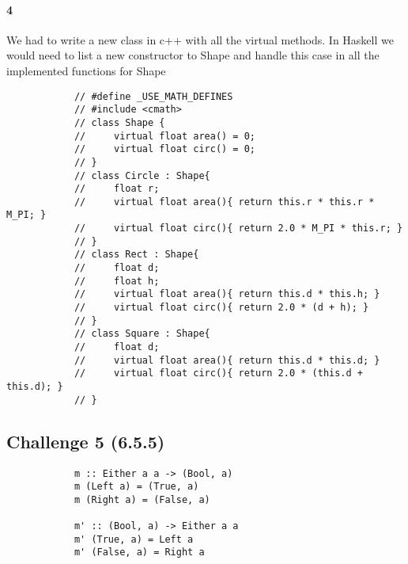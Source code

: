 \documentclass[11pt]{article}
\begin{document}
        \paragraph*{4}
        We had to write a new class in c++ with all the virtual methods. In Haskell we would need to list a new constructor to Shape and handle this case in all the implemented functions for Shape

        \begin{verbatim}
            // #define _USE_MATH_DEFINES
            // #include <cmath>
            // class Shape {
            //     virtual float area() = 0;
            //     virtual float circ() = 0;
            // }
            // class Circle : Shape{
            //     float r;
            //     virtual float area(){ return this.r * this.r * M_PI; }
            //     virtual float circ(){ return 2.0 * M_PI * this.r; }
            // }
            // class Rect : Shape{ 
            //     float d;
            //     float h;
            //     virtual float area(){ return this.d * this.h; }
            //     virtual float circ(){ return 2.0 * (d + h); }
            // }
            // class Square : Shape{
            //     float d;
            //     virtual float area(){ return this.d * this.d; }
            //     virtual float circ(){ return 2.0 * (this.d + this.d); }
            // }
        \end{verbatim}

        \subsection*{Challenge 5 (6.5.5)}
        \begin{verbatim}
            m :: Either a a -> (Bool, a)
            m (Left a) = (True, a)
            m (Right a) = (False, a)

            m' :: (Bool, a) -> Either a a
            m' (True, a) = Left a
            m' (False, a) = Right a
        \end{verbatim}
\end{document}
